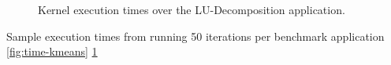 \documentclass[../document.tex]{subfiles}
\begin{document}
\begin{figure}[ht]
\begin{minipage}[b]{.45\textwidth}
\caption{Kernel execution times over the LU-Decomposition application.}
\label{fig:time-lud}
\end{minipage}
\end{figure}

Sample execution times from running 50 iterations per benchmark application
\ref{fig:time-kmeans} \ref{fig:time-lud}
\end{document}
